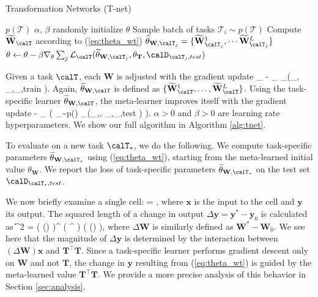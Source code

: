 \documentclass{article}
\newcommand{\x}{\mathbf{x}}
\newcommand{\y}{\mathbf{y}}
\newcommand{\W}{\mathbf{W}}
\newcommand{\Wi}{\W^i}
\newcommand{\T}{\mathbf{T}}
\newcommand{\loss}{\mathcal{L}_{\calT}}
\begin{document}
\begin{algorithm}[t]
\caption{Transformation Networks (T-net)}
\label{alg:tnet}
\begin{algorithmic}[1]
\REQUIRE $p(\mathcal{T})$
\REQUIRE $\alpha$, $\beta$
\STATE randomly initialize $\theta$
    \STATE Sample batch of tasks $ \mathcal{T}_i \sim p(\mathcal{T})$ 
        	\STATE Compute $\widetilde{\W}_{\calT}$ according to (\ref{eq:theta_wt})
        \ENDFOR
        \STATE $\widetilde{\theta}_{\W, \calT_j} = \{ \widetilde{\W}^{1}_{\calT_j}, \cdots \widetilde{\W}^{L}_{\calT_j} \}$
    \ENDFOR
    \STATE $\theta \leftarrow \theta - \beta \nabla_{\theta} \sum_{j} \loss (\widetilde{\theta}_{\W,\calT_j}, \theta_{\T},\calD_{\calT_j,test})$
\ENDWHILE
\end{algorithmic}
\end{algorithm}
Given a task $\calT$, each $\W$ is adjusted with the gradient update
\be
\label{eq:theta_wt}
\widetilde{\W}_{\calT} \leftarrow \W - \alpha \nabla_{\W} 
\loss \left(\theta_{\W}, \theta_{\T},\calD_{\calT,train} \right).
\ee
Again, $\widetilde{\theta}_{\W,\calT}$ is defined as $\{\widetilde{\W}_{\calT}^1, \ldots, \widetilde{\W}_{\calT}^L \}$.
Using the task-specific learner $\widetilde{\theta}_{\W,\calT}$, the meta-learner improves itself with the gradient update
\be
\label{eq:theta}
\theta  \leftarrow \theta - \beta \nabla_{\theta}
 \left( \sum_{\calT \sim p(\calT)} \loss \left(\widetilde{\theta}_{\W,\calT}, \theta_{\T},\calD_{\calT,test} \right) \right).
\ee
$\alpha > 0$ and $\beta > 0$ are learning rate hyperparameters.
We show our full algorithm in Algorithm \ref{alg:tnet}.

To evaluate on a new task $\calT_{\ast}$, we do the following.
We compute task-specific parameters $\widetilde{\theta}_{\W,\calT_{\ast}}$ using (\ref{eq:theta_wt}),
starting from the meta-learned initial value $\theta_{\W}$.
We report the loss of task-specific parameters $\widetilde{\theta}_{\W,\calT_{\ast}}$ on the test set $\calD_{\calT_{\ast},test}$.

We now briefly examine a single cell:
\bee
\y = \T \W \x,
\eee
where $\x$ is the input to the cell and $\y$ its output.
The squared length of a change in output $\Delta \y = \y^*-\y_0$ is calculated as
\be
\| \Delta \y \|^2 = \left( (\Delta \W) \x \right)^{\top} \left( \T^{\top} \T \right) \left( (\Delta \W) \x \right),
\ee
where $\Delta \W$ is similarly defined as $\W^*-\W_0$.
We see here that the magnitude of $\Delta \y$ is determined by the interaction between $(\Delta \W) \x$ and $\T^\top \T$.
Since a task-specific learner performs gradient descent only on $\W$ and not $\T$, the change in $\y$ resulting from (\ref{eq:theta_wt})
is guided by the meta-learned value $\T^\top \T$.
We provide a more precise analysis of this behavior in Section \ref{sec:analysis}.
\end{document}
